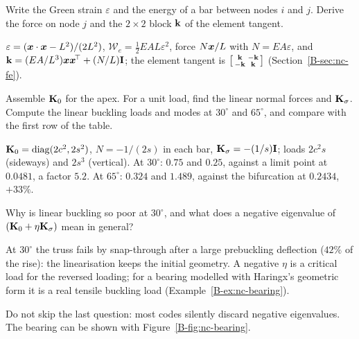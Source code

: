 
\q Write the Green strain $\varepsilon$ and the energy of a bar between nodes $i$ and $j$.
Derive the force on node $j$ and the $2\times2$ block $\mathbf{k}$ of the element tangent.
\begin{answer}
$\varepsilon = (\bm{x}\cdot\bm{x} - L^2)/(2L^2)$, $\mathcal{W}_e = \tfrac12 EAL\varepsilon^2$, force $N\bm{x}/L$ with
$N = EA\varepsilon$, and $\mathbf{k} = (EA/L^3)\bm{x}\bm{x}^{\!\top} + (N/L)\mathbf{I}$; the element tangent is
$\bigl[\begin{smallmatrix}\mathbf{k} & -\mathbf{k}\\ -\mathbf{k} & \mathbf{k}\end{smallmatrix}\bigr]$
(Section~\ref{B-sec:nc-fe}).
\end{answer}

\q Assemble $\mathbf{K}_0$ for the apex. For a unit load, find the linear normal forces and
$\mathbf{K}_\sigma$. Compute the linear buckling loads and modes at $30^\circ$ and $65^\circ$, and
compare with the first row of the table.
\begin{answer}
$\mathbf{K}_0 = \operatorname{diag}(2c^2, 2s^2)$, $N = -1/(2s)$ in each bar, $\mathbf{K}_\sigma = -(1/s)\mathbf{I}$; loads
$2c^2s$ (sideways) and $2s^3$ (vertical). At $30^\circ$: $0.75$ and $0.25$, against a limit point
at $0.0481$, a factor $5.2$. At $65^\circ$: $0.324$ and $1.489$, against the bifurcation at
$0.2434$, $+33\%$.
\end{answer}

\q Why is linear buckling so poor at $30^\circ$, and what does a negative eigenvalue of
$(\mathbf{K}_0 + \eta\mathbf{K}_\sigma)$ mean in general?
\begin{answer}
At $30^\circ$ the truss fails by snap-through after a large prebuckling deflection ($42\%$ of
the rise): the linearisation keeps the initial geometry. A negative $\eta$ is a critical load
for the reversed loading; for a bearing modelled with Haringx's geometric form it is a real
tensile buckling load (Example~\ref{B-ex:nc-bearing}).
\end{answer}

\begin{instructor}
Do not skip the last question: most codes silently discard negative eigenvalues. The bearing
can be shown with Figure~\ref{B-fig:nc-bearing}.
\end{instructor}


